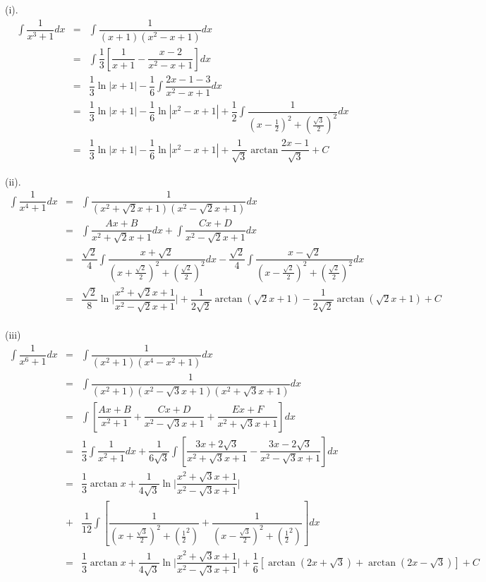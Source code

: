 \begin{corollary}[扩展不定积分]
\begin{solution}
		(i). 
		\begin{eqnarray*}
			\int \dfrac{1}{x^{3}+1} dx&=&\int \dfrac{1}{(x+1)(x^{2}-x+1)} dx\\
			                          &=&\int \dfrac{1}{3}\left[\dfrac{1}{x+1} - \dfrac{x-2}{x^{2}-x+1}\right]dx\\
			                          &=&\dfrac{1}{3}\ln |x+1| -\dfrac{1}{6}\int \dfrac{2x-1-3}{x^{2}-x+1}dx\\
			                          &=&\dfrac{1}{3}\ln |x+1| -\dfrac{1}{6}\ln |x^{2}-x+1| +\dfrac{1}{2}\int \dfrac{1}{(x-\frac{1}{2})^{2}+(\frac{\sqrt{3}}{2})^{2}}dx\\
									  &=& \dfrac{1}{3}\ln |x+1| -\dfrac{1}{6}\ln |x^{2}-x+1| +\dfrac{1}{\sqrt{3}}\arctan \dfrac{2x-1}{\sqrt{3}}+C
		\end{eqnarray*}

		(ii). 
		\begin{eqnarray*}
			\int \dfrac{1}{x^{4}+1} dx&=&\int \dfrac{1}{(x^{2}+\sqrt{2}x+1)(x^{2}-\sqrt{2}x+1)} dx\\
			                          &=&\int \dfrac{Ax+B}{x^{2}+\sqrt{2}x+1}dx + \int\dfrac{Cx+D}{x^{2}-\sqrt{2}x+1}dx\\
			                          &=&\dfrac{\sqrt{2}}{4}\int \dfrac{x+\sqrt{2}}{(x+\frac{\sqrt{2}}{2})^{2}+(\frac{\sqrt{2}}{2})^{2}}dx -\dfrac{\sqrt{2}}{4}\int \dfrac{x-\sqrt{2}}{(x-\frac{\sqrt{2}}{2})^{2}+(\frac{\sqrt{2}}{2})^{2}}dx\\
			                          &=&\dfrac{\sqrt{2}}{8}\ln \big|\dfrac{x^{2}+\sqrt{2}x+1}{x^{2}-\sqrt{2}x+1}\big| +\dfrac{1}{2\sqrt{2}}\arctan (\sqrt{2}x+1) -\dfrac{1}{2\sqrt{2}}\arctan (\sqrt{2}x+1) +C\\
		\end{eqnarray*}

		(iii)
		\begin{eqnarray*}
			\int \dfrac{1}{x^{6}+1} dx&=&\int \dfrac{1}{(x^{2}+1)(x^{4}-x^{2}+1)} dx\\
			                          &=&\int \dfrac{1}{(x^{2}+1)(x^{2}-\sqrt{3}x+1)(x^{2}+\sqrt{3}x+1)} dx\\
			                          &=&\int \left[\dfrac{Ax+B}{x^{2}+1} + \dfrac{Cx+D}{x^{2}-\sqrt{3}x+1} + \dfrac{Ex+F}{x^{2}+\sqrt{3}x+1}\right]dx\\
			                          &=&\dfrac{1}{3}\int \dfrac{1}{x^{2}+1}dx +\dfrac{1}{6\sqrt{3}}\int\left[\dfrac{3x+2\sqrt{3}}{x^{2}+\sqrt{3}x+1} - \dfrac{3x-2\sqrt{3}}{x^{2}-\sqrt{3}x+1}\right]dx\\
			                          &=&\dfrac{1}{3}\arctan x + \dfrac{1}{4\sqrt{3}}\ln \big|\dfrac{x^{2}+\sqrt{3}x+1}{x^{2}-\sqrt{3}x+1}\big|\\ 
									  &+&\dfrac{1}{12}\int \left[\dfrac{1}{(x+\frac{\sqrt{3}}{2})^{2}+(\frac{1}{2}^{2})}+\dfrac{1}{(x-\frac{\sqrt{3}}{2})^{2}+(\frac{1}{2}^{2})}\right]dx\\
			                          &=&\dfrac{1}{3}\arctan x + \dfrac{1}{4\sqrt{3}}\ln \big|\dfrac{x^{2}+\sqrt{3}x+1}{x^{2}-\sqrt{3}x+1}\big| + \dfrac{1}{6}\left[\arctan(2x+\sqrt{3})+\arctan(2x-\sqrt{3})\right]+C
		\end{eqnarray*}
	\end{solution}
\end{corollary}
